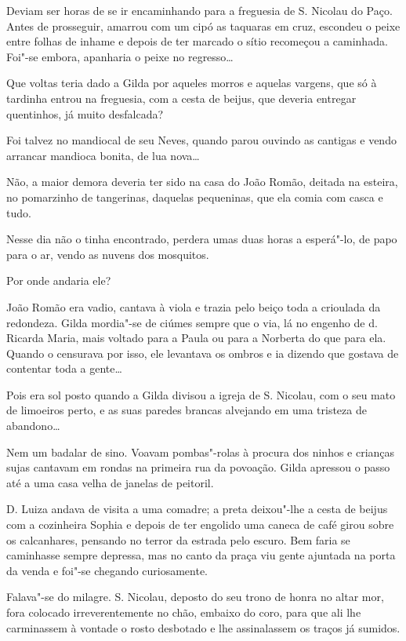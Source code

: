 Deviam ser horas de se ir encaminhando para a freguesia de S. Nicolau do
Paço. Antes de prosseguir, amarrou com um cipó as taquaras em cruz,
escondeu o peixe entre folhas de inhame e depois de ter marcado o sítio
recomeçou a caminhada. Foi"-se embora, apanharia o peixe no regresso\ldots{}

Que voltas teria dado a Gilda por aqueles morros e aquelas vargens, que
só à tardinha entrou na freguesia, com a cesta de beijus, que deveria
entregar quentinhos, já muito desfalcada?

Foi talvez no mandiocal de seu Neves, quando parou ouvindo as cantigas e
vendo arrancar mandioca bonita, de lua nova\ldots{}

Não, a maior demora deveria ter sido na casa do João Romão, deitada na
esteira, no pomarzinho de tangerinas, daquelas pequeninas, que ela comia
com casca e tudo.

Nesse dia não o tinha encontrado, perdera umas duas horas a esperá"-lo,
de papo para o ar, vendo as nuvens dos mosquitos.

Por onde andaria ele?

João Romão era vadio, cantava à viola e trazia pelo beiço toda a
crioulada da redondeza. Gilda mordia"-se de ciúmes sempre que o via, lá
no engenho de d. Ricarda Maria, mais voltado para a Paula ou para a
Norberta do que para ela. Quando o censurava por isso, ele levantava os
ombros e ia dizendo que gostava de contentar toda a gente\ldots{}

Pois era sol posto quando a Gilda divisou a igreja de S. Nicolau, com o
seu mato de limoeiros perto, e as suas paredes brancas alvejando em uma
tristeza de abandono\ldots{}

Nem um badalar de sino. Voavam pombas"-rolas à procura dos ninhos e
crianças sujas cantavam em rondas na primeira rua da povoação. Gilda
apressou o passo até a uma casa velha de janelas de peitoril.

D. Luiza andava de visita a uma comadre; a preta deixou"-lhe a cesta de
beijus com a cozinheira Sophia e depois de ter engolido uma caneca de
café girou sobre os calcanhares, pensando no terror da estrada pelo
escuro. Bem faria se caminhasse sempre depressa, mas no canto da praça
viu gente ajuntada na porta da venda e foi"-se chegando curiosamente.

Falava"-se do milagre. S. Nicolau, deposto do seu trono de honra no altar
mor, fora colocado irreverentemente no chão, embaixo do coro, para que
ali lhe carminassem à vontade o rosto desbotado e lhe assinalassem os
traços já sumidos.

